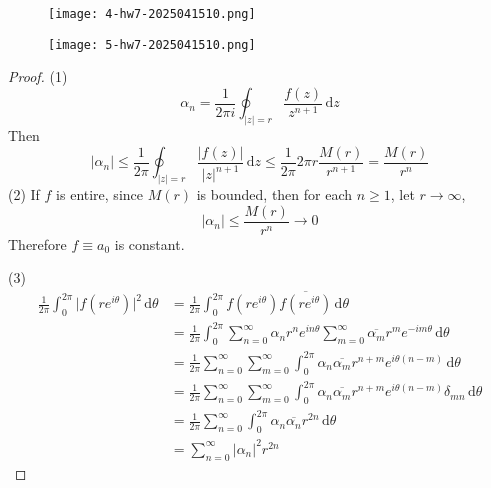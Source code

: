 \begin{exercise}
\begin{figure}[H]
\centering
\texttt{[image: 4-hw7-2025041510.png]}
\label{}
\end{figure}
\begin{figure}[H]
\centering
\texttt{[image: 5-hw7-2025041510.png]}
\label{}
\end{figure}
\end{exercise}
\begin{proof}
(1)
\[
\alpha _n=\frac{1}{2\pi i}\oint_{\lvert z \rvert =r} \frac{f(z)}{z^{n+1}} \, \mathrm{d}z
\]
Then
\[
\lvert \alpha _n \rvert \leq \frac{1}{2\pi }\oint_{\lvert z \rvert =r} \frac{\lvert f(z) \rvert }{\lvert z \rvert ^{n+1}} \, \mathrm{d}z  \leq \frac{1}{2\pi}2\pi r\frac{M(r)}{r^{n+1}}=\frac{M(r)}{r^{n}}
\]
(2)
If $f$ is entire, since $M(r)$ is bounded, then for each $n\geq1$, let $r\to \infty$,
\[
\lvert \alpha _n \rvert \leq \frac{M(r)}{r^{n}}\to0
\]
Therefore $f\equiv a_0$ is constant.

(3)
\[
\begin{aligned}
\frac{1}{2\pi}\int_{0}^{2\pi} \lvert f(re^{ i\theta }) \rvert ^2 \, \mathrm{d}\theta  & =\frac{1}{2\pi}\int_{0}^{2\pi} f(re^{ i\theta })\overline{f(re^{ i\theta })} \, \mathrm{d}\theta  \\
 & =\frac{1}{2\pi }\int_{0}^{2\pi} \sum_{n=0}^{\infty} \alpha _nr^{n}e^{ in\theta }\sum_{m=0}^{\infty}\overline{\alpha _m}r^{m}e^{ -im\theta }  \, \mathrm{d}\theta \\
  & =\frac{1}{2\pi}\sum_{n=0}^{\infty} \sum_{m=0}^{\infty} \int_{0}^{2\pi} \alpha _n \overline{\alpha _m}r^{n+m}e^{ i\theta(n-m) }  \, \mathrm{d}\theta \\
  & =\frac{1}{2\pi}\sum_{n=0}^{\infty} \sum_{m=0}^{\infty} \int_{0}^{2\pi} \alpha _n \overline{\alpha _m}r^{n+m}e^{ i\theta(n-m) }\delta _{mn}  \, \mathrm{d}\theta \\
 & =\frac{1}{2\pi}\sum_{n=0}^{\infty}\int_{0}^{2\pi} \alpha _n \overline{\alpha _n}r^{2n}  \, \mathrm{d}\theta \\
 & =\sum_{n=0}^{\infty} \lvert \alpha _n \rvert ^2 r^{2n}         
\end{aligned}
\]
\end{proof}

